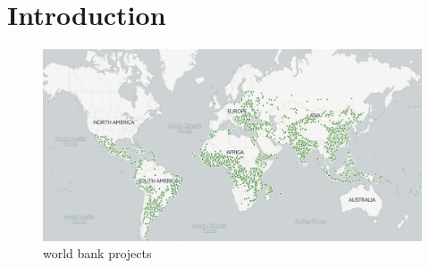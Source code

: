 \section{Introduction}
%
%
%

\begin{figure}
	\centering
	\includegraphics[width=\textwidth]{figs/wbprojects.png}
	\caption{world bank projects} \label{fig:wbprojects}
\end{figure}

